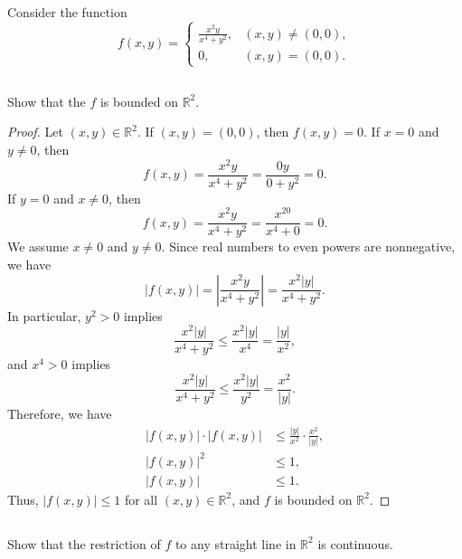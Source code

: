 \documentclass[12pt]{article}
\newenvironment{problem}
    {\begin{lrbox}{\mybox}\begin{minipage}{0.98\textwidth}}
    {\end{minipage}\end{lrbox}\framebox[\textwidth]{\usebox{\mybox}}}
\newcommand{\R}{\mathbb{R}}
\begin{document}
\newpage
\section{}
\begin{problem}
    Consider the function 
    \begin{equation}
        f(x,y) = \left \{ \begin{array}{lr}
            \frac{x^2y}{x^4+y^2},& (x,y) \ne (0,0),\\
            0,& (x,y) = (0,0).
        \end{array}\right .
    \end{equation}
\end{problem}

\subsection{}
\begin{problem}
    Show that the $f$ is bounded on $\R^2$.
\end{problem}

\begin{proof}
    Let $(x, y) \in \R^2$. If $(x, y) = (0, 0)$, then $f(x, y) = 0$. If $x = 0$ and $y \ne 0$, then
    \[
        f(x, y) = \frac{x^2y}{x^4 + y^2} = \frac{0y}{0 + y^2} = 0.
    \]
    If $y = 0$ and $x \ne 0$, then
    \[
        f(x, y) = \frac{x^2y}{x^4 + y^2} = \frac{x^20}{x^4 + 0} = 0.
    \]
    We assume $x \ne 0$ and $y \ne 0$. Since real numbers to even powers are nonnegative, we have
    \[
        |f(x, y)| = \left| \frac{x^2y}{x^4 + y^2} \right| = \frac{x^2|y|}{x^4 + y^2}.
    \]
    In particular, $y^2 > 0$ implies
    \[
        \frac{x^2|y|}{x^4 + y^2} \leq \frac{x^2|y|}{x^4} = \frac{|y|}{x^2},
    \]
    and $x^4 > 0$ implies
    \[
        \frac{x^2|y|}{x^4 + y^2}  \leq \frac{x^2|y|}{y^2} = \frac{x^2}{|y|}.
    \]
    Therefore, we have
    \begin{align*}
        |f(x, y)| \cdot |f(x, y)| &\leq \frac{|y|}{x^2} \cdot \frac{x^2}{|y|}, \\[1em]
        |f(x, y)|^2 &\leq 1, \\[1em]
        |f(x, y)| &\leq 1.
    \end{align*}
    Thus, $|f(x,y)| \leq 1$ for all $(x, y) \in \R^2$, and $f$ is bounded on $\R^2$.
    
\end{proof}

\newpage
\subsection{}
\begin{problem}
    Show that the restriction of $f$ to any straight line in $\R^2$ is continuous.
\end{problem}
\end{document}
